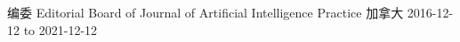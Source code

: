 


\begin{cvhonors}




\cvhonor
{编委} %
{Editorial Board of Journal of Artificial Intelligence Practice} %
{加拿大} %
{2016-12-12 to 2021-12-12} %



\end{cvhonors}
